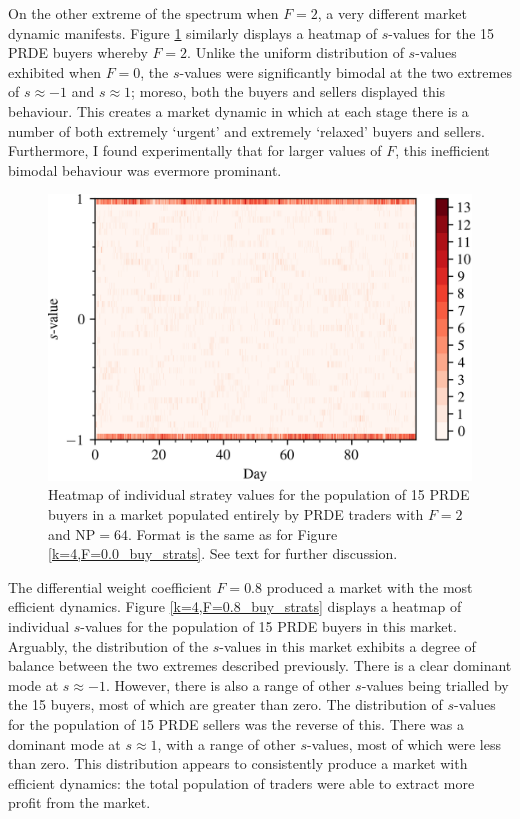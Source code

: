 \documentclass[conference]{IEEEtran}
\begin{document}
On the other extreme of the spectrum when $F=2$, a very different market dynamic manifests.
Figure \ref{k=4,F=2.0_buy_strats} similarly displays a heatmap of $s$-values for the 15 PRDE buyers whereby $F=2$.
Unlike the uniform distribution of $s$-values exhibited when $F=0$, the $s$-values were significantly bimodal at the two extremes of $s\approx-1$ and $s\approx1$; moreso, both the buyers and sellers displayed this behaviour.
This creates a market dynamic in which at each stage there is a number of both extremely `urgent' and extremely `relaxed' buyers and sellers.
Furthermore, I found experimentally that for larger values of $F$, this inefficient bimodal behaviour was evermore prominant.

\begin{figure}[htbp]
    \centerline{\includegraphics[width=\columnwidth]{k=4,F=2.0_buy_strats.png}}
    \caption{
        Heatmap of individual stratey values for the population of 15 PRDE buyers in a market populated entirely by PRDE traders with $F=2$ and $\mathrm{NP}=64$.
        Format is the same as for Figure \ref{k=4,F=0.0_buy_strats}.
        See text for further discussion.
    }
    \label{k=4,F=2.0_buy_strats}
\end{figure}

The differential weight coefficient $F=0.8$ produced a market with the most efficient dynamics.
Figure \ref{k=4,F=0.8_buy_strats} displays a heatmap of individual $s$-values for the population of 15 PRDE buyers in this market.
Arguably, the distribution of the $s$-values in this market exhibits a degree of balance between the two extremes described previously.
There is a clear dominant mode at $s\approx-1$.
However, there is also a range of other $s$-values being trialled by the 15 buyers, most of which are greater than zero.
The distribution of $s$-values for the population of 15 PRDE sellers was the reverse of this.
There was a dominant mode at $s\approx 1$, with a range of other $s$-values, most of which were less than zero.
This distribution appears to consistently produce a market with efficient dynamics: the total population of traders were able to extract more profit from the market.
\end{document}
